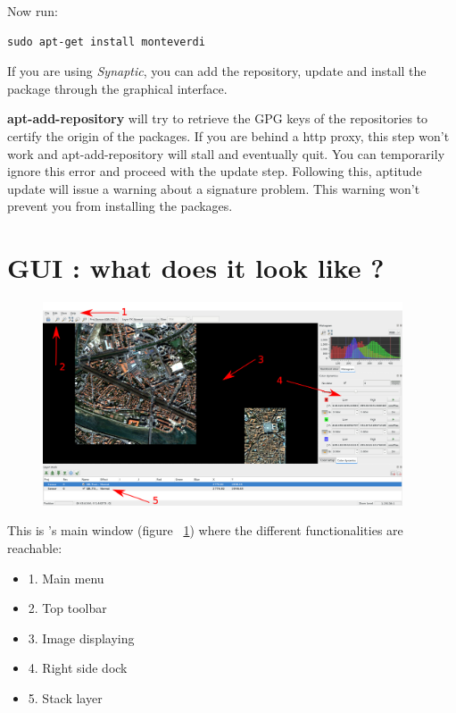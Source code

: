 Now run:
\begin{verbatim}
sudo apt-get install monteverdi
\end{verbatim}

If you are using \emph{Synaptic}, you can add the repository, update and install the package through the
graphical interface.

\textbf{apt-add-repository} will try to retrieve the GPG keys of the
repositories to certify the origin of the packages. If you are behind a http
proxy, this step won't work and apt-add-repository will stall and eventually
quit. You can temporarily ignore this error and proceed with the update
step. Following this, aptitude update will issue a warning about a signature
problem. This warning won't prevent you from installing the packages.


\section{GUI : what does it look like ?}\label{sec:mongui}


\begin{figure}[!h] 
  \center
  \includegraphics[width=0.95\textwidth]{../Art/MonteverdiImages/gui.png}
  \label{fig:mongui}
\end{figure}

This is \mont's main window (figure ~\ref{fig:mongui}) where the
different functionalities are reachable:

\begin{itemize}
\item 1. Main menu
\item 2. Top toolbar
\item 3. Image displaying
\item 4. Right side dock
\item 5. Stack layer 
\end{itemize}

